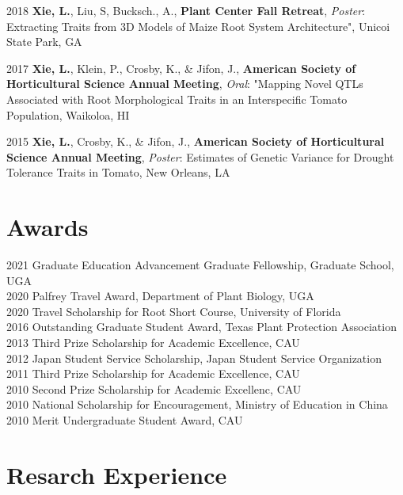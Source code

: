 \documentclass[11pt,a4paper,]{awesome-cv}
\begin{document}
2018 \textbf{Xie, L.}, Liu, S, Bucksch., A., \textbf{Plant Center Fall
Retreat}, \emph{Poster}: Extracting Traits from 3D Models of Maize Root
System Architecture", Unicoi State Park, GA

2017 \textbf{Xie, L.}, Klein, P., Crosby, K., \& Jifon, J.,
\textbf{American Society of Horticultural Science Annual Meeting},
\emph{Oral}: "Mapping Novel QTLs Associated with Root Morphological
Traits in an Interspecific Tomato Population, Waikoloa, HI

2015 \textbf{Xie, L.}, Crosby, K., \& Jifon, J., \textbf{American
Society of Horticultural Science Annual Meeting}, \emph{Poster}:
Estimates of Genetic Variance for Drought Tolerance Traits in Tomato,
New Orleans, LA

\hypertarget{awards}{%
\section{Awards}\label{awards}}

2021 Graduate Education Advancement Graduate Fellowship, Graduate
School, UGA\\
2020 Palfrey Travel Award, Department of Plant Biology, UGA\\
2020 Travel Scholarship for Root Short Course, University of Florida\\
2016 Outstanding Graduate Student Award, Texas Plant Protection
Association\\
2013 Third Prize Scholarship for Academic Excellence, CAU\\
2012 Japan Student Service Scholarship, Japan Student Service
Organization\\
2011 Third Prize Scholarship for Academic Excellence, CAU\\
2010 Second Prize Scholarship for Academic Excellenc, CAU\\
2010 National Scholarship for Encouragement, Ministry of Education in
China\\
2010 Merit Undergraduate Student Award, CAU

\hypertarget{resarch-experience}{%
\section{Resarch Experience}\label{resarch-experience}}
\end{document}
